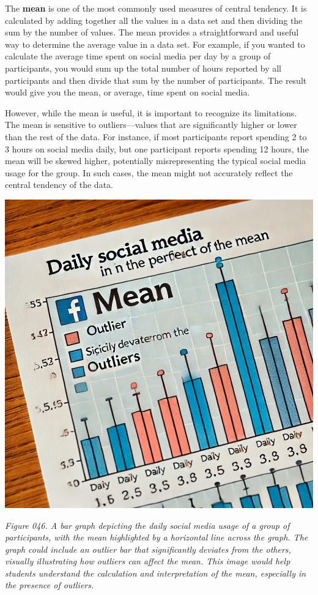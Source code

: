 \documentclass[
]{book}
\begin{document}
The \textbf{mean} is one of the most commonly used measures of central tendency. It is calculated by adding together all the values in a data set and then dividing the sum by the number of values. The mean provides a straightforward and useful way to determine the average value in a data set. For example, if you wanted to calculate the average time spent on social media per day by a group of participants, you would sum up the total number of hours reported by all participants and then divide that sum by the number of participants. The result would give you the mean, or average, time spent on social media.

However, while the mean is useful, it is important to recognize its limitations. The mean is sensitive to outliers---values that are significantly higher or lower than the rest of the data. For instance, if most participants report spending 2 to 3 hours on social media daily, but one participant reports spending 12 hours, the mean will be skewed higher, potentially misrepresenting the typical social media usage for the group. In such cases, the mean might not accurately reflect the central tendency of the data.

\includegraphics[width=1\textwidth,height=\textheight]{images/fig046.jpg}

\emph{Figure 046. A bar graph depicting the daily social media usage of a group of participants, with the mean highlighted by a horizontal line across the graph. The graph could include an outlier bar that significantly deviates from the others, visually illustrating how outliers can affect the mean. This image would help students understand the calculation and interpretation of the mean, especially in the presence of outliers.}
\end{document}
